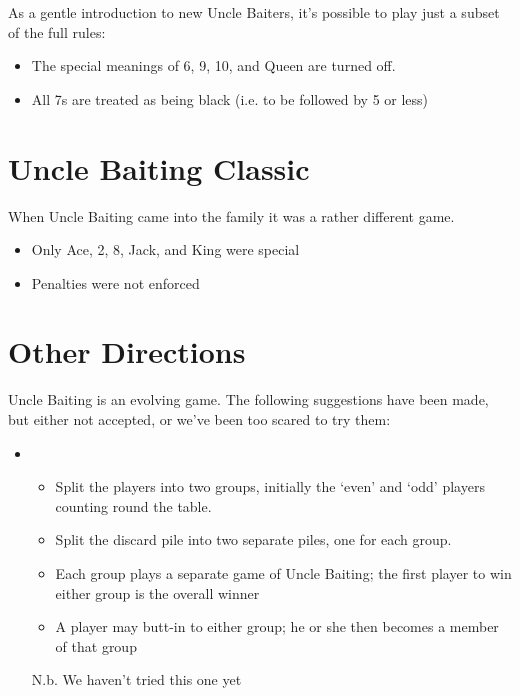 \documentclass[12pt]{article}
\begin{document}
As a gentle introduction to new Uncle Baiters, it's possible to play just a subset of the full rules:
\begin{itemize}
  \item The special meanings of 6, 9, 10, and Queen are turned off.

  \item All 7s are treated as being black (i.e. to be followed by 5 or less)
\end{itemize}

\section{Uncle Baiting Classic}
\label{Classic}

When Uncle Baiting came into the family it was a rather different game.

\begin{itemize}
  \item Only Ace, 2, 8, Jack, and King were special

  \item Penalties were not enforced
\end{itemize}

\section{Other Directions}

Uncle Baiting is an evolving game.  The following suggestions have been made, but
either not accepted, or we've been too scared to try them:

\begin{itemize}
  \item
    \begin{itemize}
      \item Split the players into two groups, initially the `even' and `odd' players counting round the table.
      \item Split the discard pile into two separate piles, one for each group.
      \item Each group plays a separate game of Uncle Baiting;  the first player to
        win either group is the overall winner
      \item A player may butt-in to either group;  he or she then becomes a member of
        that group
    \end{itemize}

    N.b. We haven't tried this one yet    
\end{itemize}
\end{document}
